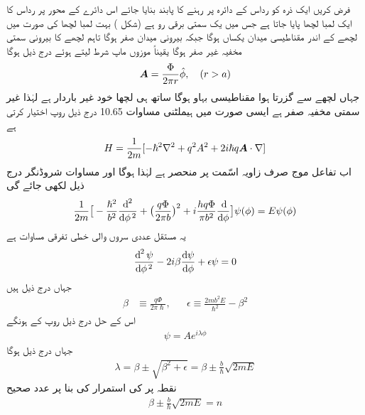  فرض کریں ایک ذرہ کو رداس  کے دائرہ پر رہنے کا پابند بنایا جائے اس دائرے کے محور پر رداس  کا ایک لمبا لچھا پایا جاتا ہے جس میں یک سمتی برقی رو  ہے  (شکل  )   بہت لمبا لچھا کی صورت میں لچھے کے اندر مقناطیسی میدان یکساں ہوگا جبکہ بیرونی میدان صفر ہوگا تاہم لچھے کا بیرونی سمتی مخفیہ غیر صفر ہوگا یقیناً موزوں ماپ شرط  لیتے ہوئے درج ذیل ہوگا 
\begin{align}
{\ensuremath{{\boldsymbol{A}}}} = \frac{\Phi}{2\pi r} \hat{\phi}, \quad (r > a)
\end{align}
جہاں  لچھے سے گزرتا ہوا  مقناطیسی بہاو ہوگا ساتھ ہی لچھا خود غیر باردار ہے لہٰذا غیر سمتی مخفیہ  صفر ہے ایسی صورت میں ہیملٹنی مساوات  10.65 درج ذیل روپ اختیار کرتی ہے 
\begin{align}
H = \frac{1}{2m} [- \hslash^2 \nabla^2 + q^2 A^2 + 2 i \hslash q {{\boldsymbol{A}}} \cdot \nabla]
\end{align}
اب تفاعل موج صرف زاویہ اسّمت  پر منحصر ہے لہٰذا  ہوگا اور مساوات شروڈنگر درج ذیل لکھی جائے گی 
\begin{align}
\frac{1}{2m} \big [ - \frac{\hslash^2}{b^2} \frac{\dif^{\,2}}{\dif \phi^{\,2}} + \big ( \frac{q \Phi}{2 \pi b} \big )^2 + i \frac{h q \Phi}{\pi b^2} \frac{\dif}{\dif \phi} \big ] \psi (\phi) = E \psi (\phi)
\end{align}
یہ مستقل عددی سروں والی خطی تفرقی مساوات ہے
\begin{align}
\frac{\dif^{\,2} \psi}{\dif \phi^{\,2}} - 2i \beta \frac{\dif \psi}{\dif \phi} + \epsilon \psi = 0
\end{align}
جہاں درج ذیل ہیں
\begin{align}
\beta &\equiv \frac{q \Phi}{2 \pi \hslash}, && \epsilon \equiv \frac{2 m b ^2 E}{\hslash^2} - \beta^2
\end{align}
اس کے حل درج ذیل روپ کے ہونگے 
\begin{align}
\psi = Ae^{i \lambda \phi}
\end{align}
جہاں درج ذیل ہوگا 
\begin{align}
\lambda = \beta \pm \sqrt{ \beta^2 + \epsilon} = \beta \pm \frac{b}{\hslash} \sqrt{2 m E}
\end{align}
نقطہ  پر  کی استمرار کی بنا پر  عدد صحیح
\begin{align}
\beta \pm \frac{b}{\hslash} \sqrt{2m E} = n
\end{align} 
